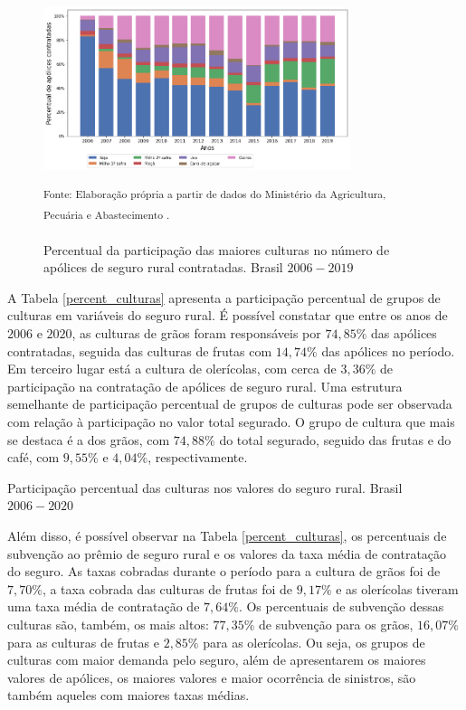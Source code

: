 \begin{figure}[H]
	\centering
	\caption{Percentual da participação das maiores culturas no número de apólices de seguro rural contratadas. Brasil $2006 - 2019$}
    	\includegraphics[width=0.8\textwidth]{figuras/percent_apolic_cult.png}\\
	\parbox{\dimexpr\linewidth-2.8cm}{\raggedright
    \strut \textsuperscript{Fonte: Elaboração própria a partir de dados do Ministério da Agricultura, Pecuária e Abastecimento \cite{brasil21b}.}\strut}
    \label{percent_cult_apol}
\end{figure}

A Tabela \ref{percent_culturas} apresenta a participação percentual de grupos de culturas em variáveis do seguro rural. É possível constatar que entre os anos de $2006$ e $2020$, as culturas de grãos foram responsáveis por $74,85\%$ das apólices contratadas, seguida das culturas de frutas com $14,74\%$ das apólices no período. Em terceiro lugar está a cultura de olerícolas, com cerca de $3,36\%$ de participação na contratação de apólices de seguro rural. Uma estrutura semelhante de participação percentual de grupos de culturas pode ser observada com relação à participação no valor total segurado. O grupo de cultura que mais se destaca é a dos grãos, com $74,88\%$ do total segurado, seguido das frutas e do café, com $9,55\%$ e $4,04\%$, respectivamente. 

\begin{small}
\begin{table}[H]
\caption{Participação percentual das culturas nos valores do seguro rural. Brasil $2006-2020$}\label{percent_culturas}
 
\end{table}
\end{small}

Além disso, é possível observar na Tabela \ref{percent_culturas}, os percentuais de subvenção ao prêmio de seguro rural e os valores da taxa média de contratação do seguro. As taxas cobradas durante o período para a cultura de grãos foi de $7,70\%$, a taxa cobrada das culturas de frutas foi de $9,17\%$ e as olerícolas tiveram uma taxa média de contratação de $7,64\%$. Os percentuais de subvenção dessas culturas são, também, os mais altos: $77,35\%$ de subvenção para os grãos, $16,07\%$ para as culturas de frutas e $2,85\%$ para as olerícolas. Ou seja, os grupos de culturas com maior demanda pelo seguro, além de apresentarem os maiores valores de apólices, os maiores valores e maior ocorrência de sinistros, são também aqueles com maiores taxas médias. 

